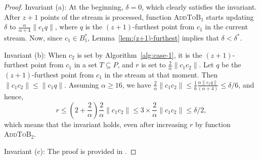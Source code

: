 \documentclass[envcountsame]{cls/cccg15}
\newcommand{\rc}{r}
\newcommand{\cp}{c_p}
\newcommand{\dz}{(d + 1)(z + 1)}
\newcommand{\textproc}{\textsc}
\newcommand{\len}[1]{\|{#1}\|}
\newcommand{\radius}[1]{\frac{2}{\alpha} \len{c_1 #1}}
\newcommand{\lee}{\leqslant}
\newcommand{\gee}{\geqslant}
\renewcommand{\leq}{\lee}
\renewcommand{\ge}{\gee}
\newcommand{\REM}[1]{}
\begin{document}
\begin{proof} 
Invariant (a): 
At the beginning, $\delta = 0$, which clearly satisfies the invariant.
After $z+1$ points of the stream is processed, 
function \textproc{AddToB$_1$} starts updating $\delta$
to $\frac{\alpha}{\alpha+4}\len{c_1q}$,
where $q$ is the $(z+1)$-furthest point from $c_1$ in the current stream.
Now, since $c_1 \in B_1^*$, Lemma~\ref{lem:(z+1)-furthest}
implies that $\delta < \delta^*$.

Invariant (b): 
When $c_2$ is set by Algorithm~\ref{alg:case-1}, 
it is the $(z+1)$-furthest point from $c_1$ in a set $T \subseteq P$,
and $\rc$ is set to $\frac{2}{\alpha}\len{c_1c_2}$.
Let $q$ be the $(z+1)$-furthest point from $c_1$ in the stream at that moment.
Then $\len{c_1c_2} \leq \len{c_1q}$.
Assuming $\alpha \ge 16$, we have 
$\radius{c_2} \leq \frac{1}{6}\frac{\alpha \len{c_1 q}}{(\alpha + 4)} \leq \delta / 6$, 
and hence,  
$$
	r \leq (2 + \frac{2}{\alpha})\radius{c_2} \leq 3 \times \radius{c_2}  \leq \delta /2,
$$
which means that the invariant holds, 
even after increasing $r$ by function \textproc{AddToB$_2$}.

Invariant (c): The proof is provided in . 

\REM{
Invariant (c): 
We first claim that if $c_2$ is set, then
$B(c_p, \radius{c_p}) \subseteq B_2(c_2, r)$.
If $|B_2| < \dz$, then $c_p = c_2$ and $r = \radius{c_2}$, 
and hence, $B_2 = B(c_p, \radius{c_p})$. 
When the size of $B_2$ reaches $\dz$, 
the central point $\cp$ moves to the centerpoint of $B_2$,
and $\rc$ is increased by a factor of $(2 + \frac{2}{\alpha})$. 
Because the centerpoint of $B_2$ locates in $B_2$, then $c_p \in B(c_2, \radius{c_2})$.
Thus, if $|B_2| \ge \dz$ then $\len{c_2 c_p} \leq \radius{c_2}$, and hence
$$
	\radius{c_p} \leq \frac{2 (\len{c_1 c_2} + \len{c_2 c_p})}{\alpha} \leq \radius{c_2}(1 + \frac{2}{\alpha}).
$$ 
Therefore, $B(c_p, \radius{c_p}) \subseteq B_2(c_2, \radius{c_2}(2 + \frac{2}{\alpha}))$.

A point $p$ can be added to $B_1$ in two cases. %
The first case is in function \textproc{AddToB$_1$}, 
where the point is added to $B_1$ only if it is within distance $\delta$ of the center $c_1$,  
which by invariant (a), 
guaranties $\len{pc_1} < \delta^*$. Therefore, $p \not \in B_2^*$ in this case.

}
\end{proof}
\end{document}
